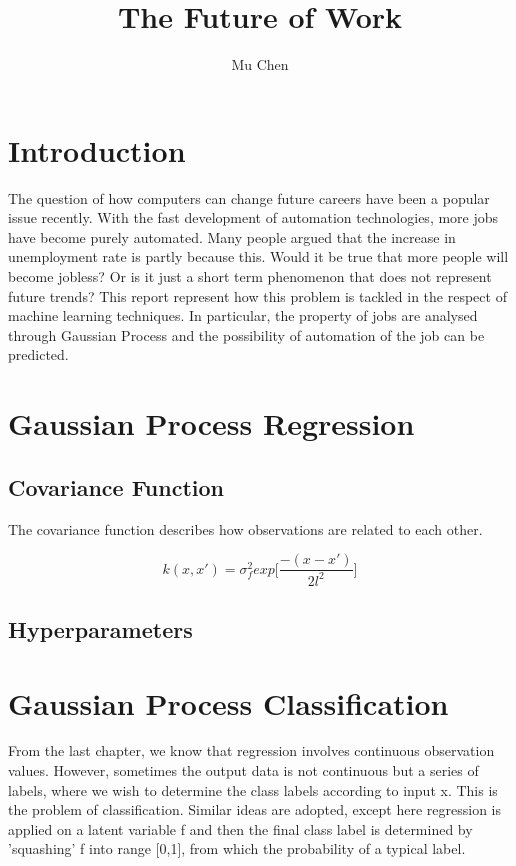 \documentclass[11pt]{report}
\title{The Future of Work}
\author{Mu Chen}
\begin{document}

\section{Introduction}
The question of how computers can change future careers have been a popular issue recently. With the fast development of automation technologies, more jobs have become purely automated. Many people argued that the increase in unemployment rate is partly because this. Would it be true that more people will become jobless? Or is it just a short term phenomenon that does not represent future trends? This report represent how this problem is tackled in the respect of machine learning techniques. In particular, the property of jobs are analysed through Gaussian Process and the possibility of automation of the job can be predicted. 

\newpage
{}
\section{Gaussian Process Regression}

\subsection{Covariance Function}
The covariance function describes how observations are related to each other.

\[k(x,x\prime) = \sigma_f^2exp\big[\frac{-(x-x\prime)}{2l^2}\big]\]

\subsection{Hyperparameters}

\newpage
{}
\section{Gaussian Process Classification}
From the last chapter, we know that regression involves continuous observation values. However, sometimes the output data is not continuous but a series of labels, where we wish to determine the class labels according to input x. This is the problem of classification. Similar ideas are adopted, except here regression is applied on a latent variable f and then the final class label is determined by 'squashing' f into range [0,1], from which the probability of a typical label.
\end{document}
